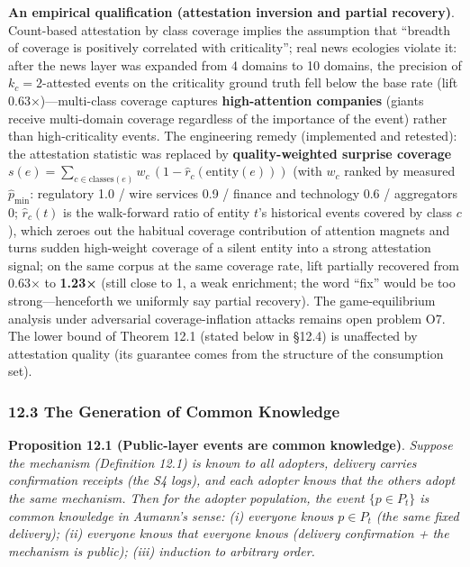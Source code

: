 \documentclass[
  11pt]{article}
\begin{document}
\textbf{An empirical qualification (attestation inversion and partial
recovery)}. Count-based attestation by class coverage implies the
assumption that ``breadth of coverage is positively correlated with
criticality''; real news ecologies violate it: after the news layer was
expanded from 4 domains to 10 domains, the precision of
\(k_c=2\)-attested events on the criticality ground truth fell below the
base rate (lift 0.63×)---multi-class coverage captures
\textbf{high-attention companies} (giants receive multi-domain coverage
regardless of the importance of the event) rather than high-criticality
events. The engineering remedy (implemented and retested): the
attestation statistic was replaced by \textbf{quality-weighted surprise
coverage}
\(s(e)=\sum_{c\in\mathrm{classes}(e)} w_c\,(1-\hat r_c(\mathrm{entity}(e)))\)
(with \(w_c\) ranked by measured \(\hat p_{\min}\): regulatory 1.0 /
wire services 0.9 / finance and technology 0.6 / aggregators 0;
\(\hat r_c(t)\) is the walk-forward ratio of entity \(t\)'s historical
events covered by class \(c\)), which zeroes out the habitual coverage
contribution of attention magnets and turns sudden high-weight coverage
of a silent entity into a strong attestation signal; on the same corpus
at the same coverage rate, lift partially recovered from 0.63× to
\textbf{1.23×} (still close to 1, a weak enrichment; the word ``fix''
would be too strong---henceforth we uniformly say partial recovery). The
game-equilibrium analysis under adversarial coverage-inflation attacks
remains open problem O7. The lower bound of Theorem 12.1 (stated below
in §12.4) is unaffected by attestation quality (its guarantee comes from
the structure of the consumption set).

\subsubsection{12.3 The Generation of Common
Knowledge}\label{the-generation-of-common-knowledge}

\textbf{Proposition 12.1 (Public-layer events are common knowledge)}.
\emph{Suppose the mechanism (Definition 12.1) is known to all adopters,
delivery carries confirmation receipts (the S4 logs), and each adopter
knows that the others adopt the same mechanism. Then for the adopter
population, the event \(\{p \in P_t\}\) is common knowledge in Aumann's
sense: (i) everyone knows \(p \in P_t\) (the same fixed delivery); (ii)
everyone knows that everyone knows (delivery confirmation + the
mechanism is public); (iii) induction to arbitrary order.}
\end{document}
